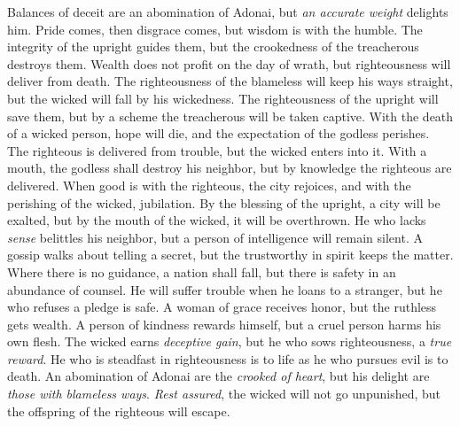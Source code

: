 \begin{biblechapter} %
\verse Balances of deceit are an abomination of Adonai, 
but \textit{an accurate weight} delights him.
\verse Pride comes, then disgrace comes, 
but wisdom is with the humble.
\verse The integrity of the upright guides them, 
but the crookedness of the treacherous destroys them.
\verse Wealth does not profit on the day of wrath, 
but righteousness will deliver from death.
\verse The righteousness of the blameless will keep his ways straight, 
but the wicked will fall by his wickedness.
\verse The righteousness of the upright will save them, 
but by a scheme the treacherous will be taken captive.
\verse With the death of a wicked person, hope will die, 
and the expectation of the godless perishes.
\verse The righteous is delivered from trouble, 
but the wicked enters into it.
\verse With a mouth, the godless shall destroy his neighbor, 
but by knowledge the righteous are delivered.
\verse When good is with the righteous, the city rejoices, 
and with the perishing of the wicked, jubilation.
\verse By the blessing of the upright, a city will be exalted, 
but by the mouth of the wicked, it will be overthrown.
\verse He who lacks \textit{sense} belittles his neighbor, 
but a person of intelligence will remain silent.
\verse A gossip walks about telling a secret, 
but the trustworthy in spirit keeps the matter.
\verse Where there is no guidance, a nation shall fall, 
but there is safety in an abundance of counsel.
\verse He will suffer trouble when he loans to a stranger, 
but he who refuses a pledge is safe.
\verse A woman of grace receives honor, 
but the ruthless gets wealth.
\verse A person of kindness rewards himself, 
but a cruel person harms his own flesh.
\verse The wicked earns \textit{deceptive gain}, 
but he who sows righteousness, a \textit{true reward}.
\verse He who is steadfast in righteousness is to life 
as he who pursues evil is to death.
\verse An abomination of Adonai are the \textit{crooked of heart}, 
but his delight are \textit{those with blameless ways}.
\verse \textit{Rest assured}, the wicked will not go unpunished, 
but the offspring of the righteous will escape.

\end{biblechapter}
